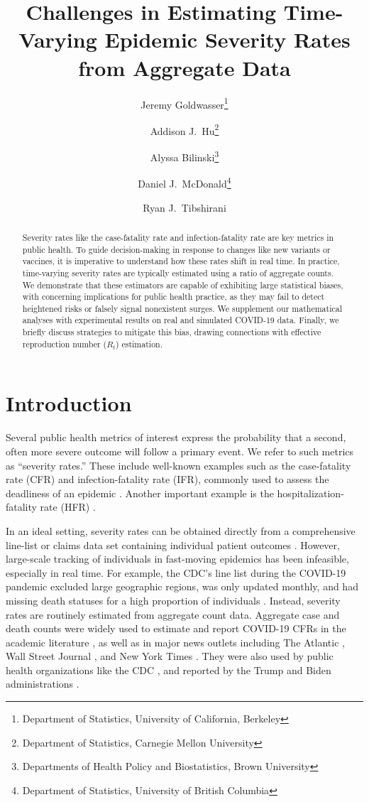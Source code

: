 \documentclass{article}
\title{Challenges in Estimating Time-Varying Epidemic Severity Rates from
  Aggregate Data}
\author{Jeremy Goldwasser\thanks{Department of Statistics, University of
    California, Berkeley} 
  \and  
  Addison J.\ Hu\thanks{Department of Statistics, Carnegie Mellon University}
  \and 
  Alyssa Bilinski\thanks{Departments of Health Policy and Biostatistics, Brown University} 
  \and
  Daniel J.\ McDonald\thanks{Department of Statistics, University of British
    Columbia} 
  \and 
  Ryan J.\ Tibshirani\footnotemark[1]}
\date{}
\begin{document}
\maketitle

\begin{abstract}
Severity rates like the case-fatality rate and infection-fatality rate are
key metrics in public health. To guide decision-making in response to changes
like new variants or vaccines, it is imperative to understand how these rates
shift in real time. In practice, time-varying severity rates are typically
estimated using a ratio of aggregate counts. We demonstrate that these
estimators are capable of exhibiting large statistical biases, with concerning
implications for public health practice, as they may fail to detect heightened 
risks or falsely signal nonexistent surges. We supplement our mathematical 
analyses with experimental results on real and simulated COVID-19 data. Finally,
we briefly discuss strategies to mitigate this bias, drawing connections with
effective reproduction number ($R_t$) estimation.    
\end{abstract}

\section{Introduction}

Several public health metrics of interest express the probability that a second,
often more severe outcome will follow a primary event. 
We refer to such metrics as ``severity rates.''
These include well-known examples such as the case-fatality rate (CFR) and infection-fatality rate (IFR), commonly used to assess the deadliness of an epidemic \citep{nishiuraEx1, nishiuraEx2, timevar_ifr, lancet_ifr}. 
Another important example 
is the hospitalization-fatality rate (HFR) \citep{HFR_linelist3, HFR_linelist1,  
  HFR_linelist2}.

In an ideal setting, severity rates can be obtained directly from a
comprehensive line-list or claims data set containing individual patient
outcomes \citep{HFR_linelist3, cfr_line_list}.
However, large-scale tracking of individuals in fast-moving epidemics
has been infeasible, especially in real time. 
For example, the CDC's line list during the COVID-19 pandemic excluded large geographic regions, was only updated monthly, and had missing death statuses for a high proportion of individuals \citep{CDC_line_list}.
Instead, severity
rates are routinely estimated from aggregate count data. 
Aggregate 
case and death counts were widely used to estimate and report COVID-19 CFRs in the academic literature \citep{yuan2020monitoring,
  horita2022global, LIU2023100350, germany}, as well as in major news outlets including
The Atlantic \citep{atlantic}, Wall Street Journal \citep{wsj}, and New York Times \citep{nyt}. 
They were also used by public health organizations like the CDC \citep{ahmad2023covid,mississippi}, and reported by the Trump and Biden administrations \citep{whitehouse2020mcenany, whitehouse2021briefing}. 
\end{document}

